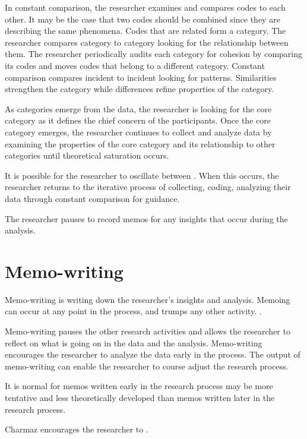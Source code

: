 In constant comparison, the researcher examines and compares codes to each other. It may be the case that two codes should be combined since they are describing the same phenomena. Codes that are related form a category. The researcher compares category to category looking for the relationship between them. The researcher periodically audits each category for cohesion by comparing its codes and moves codes that belong to a different category. Constant comparison compares incident to incident looking for patterns. Similarities strengthen the category while differences refine properties of the category. 

As categories emerge from the data, the researcher is looking for the core category as it defines the chief concern of the participants. Once the core category emerges, the researcher continues to collect and analyze data by examining the properties of the core category and its relationship to other categories until theoretical saturation occurs.

It is possible for the researcher to oscillate between  \cite{Charmaz}. When this occurs, the researcher returns to the iterative process of collecting, coding, analyzing their data through constant comparison for guidance.

The researcher pauses to record memos for any insights that occur during the analysis.

\section{Memo-writing}
Memo-writing is writing down the researcher's insights and analysis. Memoing can occur at any point in the process, and trumps any other activity.   \cite{Charmaz}. 

Memo-writing pauses the other research activities and allows the researcher to reflect on what is going on in the data and the analysis. Memo-writing encourages the researcher to analyze the data early in the process. The output of memo-writing can enable the researcher to course adjust the research process.

It is normal for memos written early in the research process may be more tentative and less theoretically developed than memos written later in the research process. 

Charmaz encourages the researcher to  \cite{Charmaz}.

